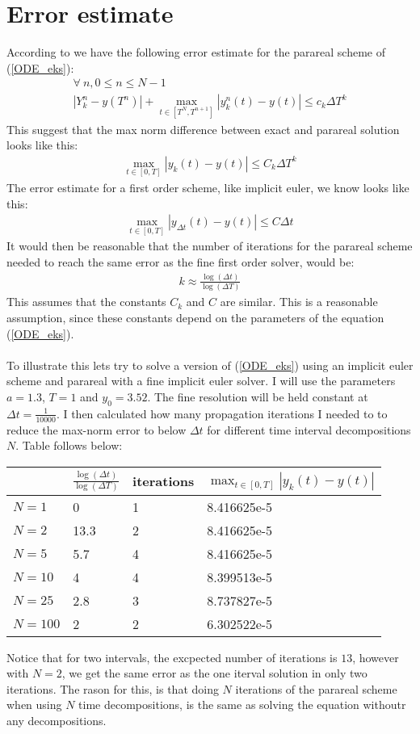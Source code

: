 \documentclass[11pt,a4paper]{article}
\begin{document}
\section{Error estimate}
According to \cite{lions2001resolution} we have the following error estimate for the parareal scheme of (\ref{ODE_eks}):
\begin{gather*}
\forall \ n,0\leq n\leq N-1 \\ |Y_k^n-y(T^n)| + \max_{t\in[T^N,T^{n+1}]}|y_k^n(t)-y(t)| \leq c_k\Delta T^k
\end{gather*} 
This suggest that the max norm difference between exact and parareal solution looks like this:
\begin{align*}
\max_{t\in[0,T]}|y_k(t)-y(t)| \leq C_k\Delta T^k
\end{align*}
The error estimate for a first order scheme, like implicit euler, we know looks like this:
\begin{align*}
\max_{t\in[0,T]}|y_{\Delta t}(t)-y(t)| \leq C\Delta t
\end{align*}
It would then be reasonable that the number of iterations for the parareal scheme needed to reach the same error as the fine first order solver, would be:
\begin{align*}
k\approx\frac{\log(\Delta t)}{\log(\Delta T)}
\end{align*}
This assumes that the constants $C_k$ and $C$ are similar. This is a reasonable assumption, since these constants depend on the parameters of the equation (\ref{ODE_eks}). 
\\
\\
To illustrate this lets try to solve a version of (\ref{ODE_eks}) using an implicit euler scheme and parareal with a fine implicit euler solver. I will use  the parameters $a=1.3$, $T=1$ and $y_0= 3.52$. The fine resolution will be held constant at $\Delta t=\frac{1}{10000}$. I then calculated how many propagation iterations I needed to to reduce the max-norm error to below $\Delta t$ for different time interval decompositions $N$. Table follows below:
 \begin{center}
    \begin{tabular}{| l | l | l | l |}
    \hline
     & $\frac{\log(\Delta t)}{\log(\Delta T)}$&iterations  & $\max_{t\in[0,T]}|y_k(t)-y(t)|$   \\ \hline
    $N=1$ &0 & 1& 8.416625e-5 	\\ \hline
    $N=2$ &13.3 &2& 8.416625e-5 	\\ \hline
    $N=5$ &5.7&4& 8.416625e-5	\\ \hline
    $N=10$ &4&4& 8.399513e-5	\\ \hline
    $N=25$ &2.8&3& 	8.737827e-5\\ \hline
    $N=100$ &2&2&	6.302522e-5\\ \hline
    \end{tabular}
\end{center}
Notice that for two intervals, the excpected number of iterations is $13$, however with $N=2$, we get the same error as the one iterval solution in only two iterations. The rason for this, is that doing $N$ iterations of the parareal scheme when using $N$ time decompositions, is the same as solving the equation withoutr any decompositions. 
\end{document}
